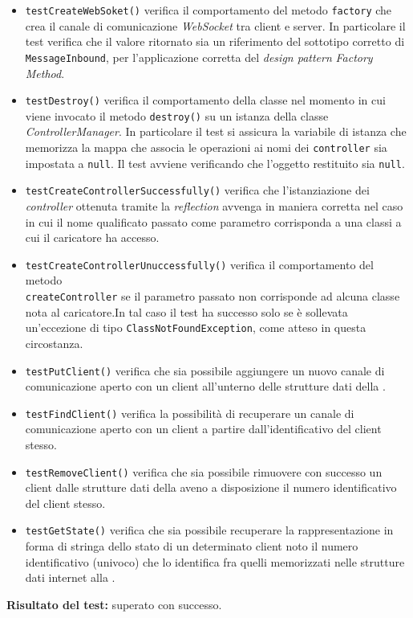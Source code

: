 \begin{itemize}
\begin{itemize}
\item \texttt{testCreateWebSoket()} verifica il comportamento del metodo \texttt{factory} che crea il canale di comunicazione \textit{WebSocket} tra client e server. In particolare il test verifica che il valore ritornato sia un riferimento del sottotipo corretto di \texttt{MessageInbound}, per l'applicazione corretta del \textit{design pattern} \textit{Factory Method}.

\item \texttt{testDestroy()} verifica il comportamento della classe nel momento in cui viene invocato il metodo \texttt{destroy()} su un istanza della classe \textit{ControllerManager}. In particolare il test si assicura la variabile di istanza che memorizza la mappa che associa le operazioni ai nomi dei \texttt{controller} sia impostata a \texttt{null}.
Il test avviene verificando che l'oggetto restituito sia \texttt{null}.

\item \texttt{testCreateControllerSuccessfully()} verifica che l'istanziazione dei \textit{controller} ottenuta tramite la \textit{reflection} avvenga in maniera corretta nel caso in cui il nome qualificato passato come parametro corrisponda a una classi a cui il caricatore ha accesso.

\item \texttt{testCreateControllerUnuccessfully()} verifica il comportamento del metodo \\ \texttt{createController} se il parametro passato non corrisponde ad alcuna classe nota al caricatore.In tal caso il test ha successo solo se è sollevata un'eccezione di tipo \texttt{ClassNotFoundException}, come atteso in questa circostanza.

\item \texttt{testPutClient()} verifica che sia possibile aggiungere un nuovo canale di comunicazione aperto con un client all'unterno delle strutture dati della .

\item \texttt{testFindClient()} verifica la possibilità di recuperare un canale di comunicazione aperto con un client a partire dall'identificativo del client stesso.

\item \texttt{testRemoveClient()} verifica che sia possibile rimuovere con successo un client dalle strutture dati della  aveno a disposizione il numero identificativo del client stesso.

\item \texttt{testGetState()} verifica che sia possibile recuperare la rappresentazione in forma di stringa dello stato di un determinato client noto il numero identificativo (univoco) che lo identifica fra quelli memorizzati nelle strutture dati internet alla .

 \end{itemize}
\textbf{Risultato del test:} superato con successo.

\end{itemize}

